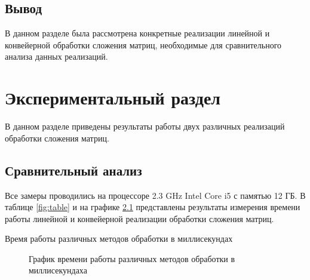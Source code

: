 \documentclass[12pt, a4paper]{report}
\begin{document}
	\section{Вывод}
	\hspace{0.5cm}В данном разделе была рассмотрена конкретные реализации линейной и конвейерной обработки сложения матриц, необходимые для сравнительного анализа данных реализаций.
			
	\chapter{Экспериментальный раздел}
	\hspace{0.5cm}В данном разделе приведены результаты работы двух различных реализаций обработки сложения матриц.
	
	\section{Сравнительный анализ}
	\hspace{0.5cm}Все замеры проводились на процессоре 2.3 GHz Intel Core i5 с памятью 12 ГБ. В таблице \ref{fig:table} и на графике \ref{fig:graph}
	представлены результаты измерения времени работы линейной и конвейерной реализации обработки сложения матриц.

	

	\begin{table}[ht!]
		\label{fig:table}
		\caption{Время работы различных методов обработки в миллисекундах}
		\begin{center}
		\end{center}
	\end{table}

	\begin{figure}[ht!]
		\label{fig:graph}
		\caption{График времени работы различных методов обработки в миллисекундаха}
	\end{figure}
\end{document}
